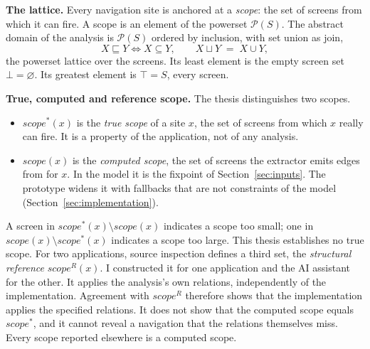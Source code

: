 \textbf{The lattice.} Every navigation site is anchored at a \emph{scope}: the set of screens
from which it can fire. A scope is an element of the powerset $\mathcal{P}(S)$. The abstract
domain of the analysis is $\mathcal{P}(S)$ ordered by inclusion, with set union as join,
\[
  X \sqsubseteq Y \iff X \subseteq Y, \qquad X \sqcup Y \;=\; X \cup Y ,
\]
the powerset lattice over the screens. Its least element is the empty screen set
$\bot = \varnothing$. Its greatest element is
$\top = S$, every screen.

\textbf{True, computed and reference scope.} The thesis distinguishes two scopes.
\begin{itemize}
\item $\mathit{scope}^{*}(x)$ is the \emph{true scope} of a site $x$, the set of screens from
which $x$ really can fire. It is a property of the application, not of any analysis.
\item $\mathit{scope}(x)$ is the \emph{computed scope}, the set of screens the extractor emits
edges from for $x$. In the model it is the fixpoint of Section~\ref{sec:inputs}. The prototype
widens it with fallbacks that are not constraints of the model
(Section~\ref{sec:implementation}).
\end{itemize}
A screen in $\mathit{scope}^{*}(x) \setminus \mathit{scope}(x)$ indicates a scope too small;
one in $\mathit{scope}(x) \setminus \mathit{scope}^{*}(x)$ indicates a scope too large. This
thesis establishes no true scope. For two applications, source inspection defines a third set,
the \emph{structural reference} $\mathit{scope}^{R}(x)$. I constructed it for one
application and the AI assistant for the other. It applies the analysis's own relations,
independently of the implementation. Agreement with
$\mathit{scope}^{R}$ therefore shows that the implementation applies the specified relations.
It does not show that the computed scope equals $\mathit{scope}^{*}$, and it cannot reveal a
navigation that the relations themselves miss. Every scope reported elsewhere is a computed
scope.

